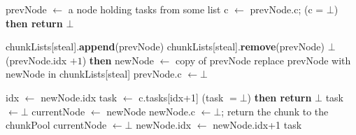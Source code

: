 \begin{algo}[!ht]
\begin{minipage}[t]{0.48\textwidth}
\begin{distribalgo}[1]
	\STATE prevNode $\leftarrow$ a node holding tasks from some list 
	\STATE c $\leftarrow$ prevNode.c;
   (c = $\bot$) {\bf then return} $\bot$

  \STATE chunkLists[steal].{\bf append}(prevNode)
 		\STATE chunkLists[steal].{\bf remove}(prevNode)
 		 $\bot$ 
	\ENDINDENT
	(prevNode.idx $+1$) {\bf then}
	\smallskip
	\STATE newNode $\leftarrow$ copy of prevNode
	\STATE replace prevNode with newNode in chunkLists[steal]
	\STATE prevNode.c $\leftarrow \bot$ 
	
	\smallskip
	\STATE idx $\leftarrow$ newNode.idx
	\STATE task $\leftarrow$ c.tasks[idx+1] 
	 (task $= \bot$) {\bf then return} $\bot$ 
		\STATE task $\leftarrow \bot$
	\ENDINDENT
	\STATE currentNode $\leftarrow$ newNode
  	\STATE newNode.c $\leftarrow \bot$; return the chunk to the chunkPool
  	\STATE currentNode $\leftarrow \bot$
  \ENDINDENT
	\STATE newNode.idx $\leftarrow$ newNode.idx+1
	 task
\ENDINDENT

\setcounter{alg:non-fifo:lines}{\value{ALC@line}}
\end{distribalgo}
\end{minipage}
\end{algo}

